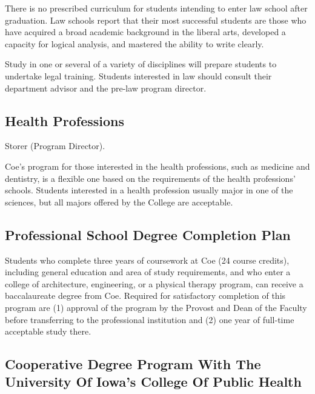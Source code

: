 \documentclass[
  letterpaper,
]{scrbook}
\begin{document}
There is no prescribed curriculum for students intending to enter law
school after graduation. Law schools report that their most successful
students are those who have acquired a broad academic background in the
liberal arts, developed a capacity for logical analysis, and mastered
the ability to write clearly.

Study in one or several of a variety of disciplines will prepare
students to undertake legal training. Students interested in law should
consult their department advisor and the pre-law program director.

\subsection{Health Professions}\label{health-professions}

Storer (Program Director).

Coe's program for those interested in the health professions, such as
medicine and dentistry, is a flexible one based on the requirements of
the health professions' schools. Students interested in a health
profession usually major in one of the sciences, but all majors offered
by the College are acceptable.

\subsection{Professional School Degree Completion
Plan}\label{professional-school-degree-completion-plan}

Students who complete three years of coursework at Coe (24 course
credits), including general education and area of study requirements,
and who enter a college of architecture, engineering, or a physical
therapy program, can receive a baccalaureate degree from Coe. Required
for satisfactory completion of this program are (1) approval of the
program by the Provost and Dean of the Faculty before transferring to
the professional institution and (2) one year of full-time acceptable
study there.

\subsection{Cooperative Degree Program With The University Of Iowa's
College Of Public
Health}\label{cooperative-degree-program-with-the-university-of-iowas-college-of-public-health}
\end{document}
